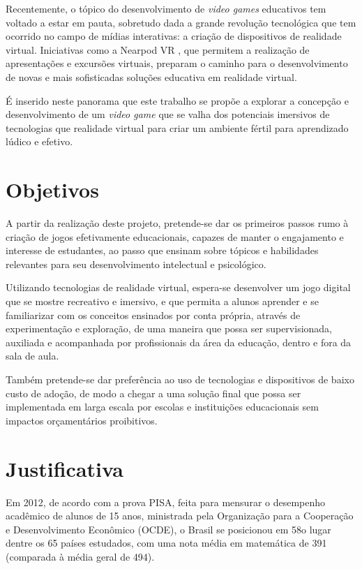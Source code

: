 Recentemente, o tópico do desenvolvimento de \textit{video games} educativos tem voltado a estar em pauta, sobretudo dada a grande revolução tecnológica que tem ocorrido no campo de mídias interativas: a criação de dispositivos de realidade virtual. Iniciativas como a Nearpod VR \cite{nearpod}, que permitem a realização de apresentações e excursões virtuais, preparam o caminho para o desenvolvimento de novas e mais sofisticadas soluções educativa em realidade virtual.

É inserido neste panorama que este trabalho se propõe a explorar a concepção e desenvolvimento de um \textit{video game} que se valha dos potenciais imersivos de tecnologias que realidade virtual para criar um ambiente fértil para aprendizado lúdico e efetivo.


\section{Objetivos}\label{sec-objetivos}

A partir da realização deste projeto, pretende-se dar os primeiros passos rumo à criação de jogos efetivamente educacionais, capazes de manter o engajamento e interesse de estudantes, ao passo que ensinam sobre tópicos e habilidades relevantes para seu desenvolvimento intelectual e psicológico.

Utilizando tecnologias de realidade virtual, espera-se desenvolver um jogo digital que se mostre recreativo e imersivo, e que permita a alunos aprender e se familiarizar com os conceitos ensinados por conta própria, através de experimentação e exploração, de uma maneira que possa ser supervisionada, auxiliada e acompanhada por profissionais da área da educação, dentro e fora da sala de aula.

Também pretende-se dar preferência ao uso de tecnologias e dispositivos de baixo custo de adoção, de modo a chegar a uma solução final  que possa ser implementada em larga escala por escolas e instituições educacionais sem impactos orçamentários proibitivos.

\section{Justificativa}\label{sec-justificativas}

Em 2012, de acordo com a prova PISA, feita para mensurar o desempenho acadêmico de alunos de 15 anos, ministrada pela Organização para a Cooperação e Desenvolvimento Econômico (OCDE), o Brasil se posicionou em 58o lugar dentre os 65 países estudados, com uma nota média em matemática de 391 (comparada à média geral de 494).

